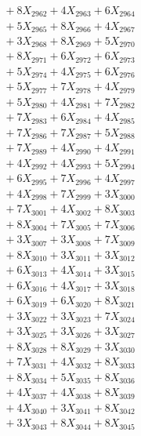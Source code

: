 \documentclass[a4paper,10pt]{article}
\begin{document}
{\begin{align}
&\;  + 8 X_{2962} + 4 X_{2963} + 6 X_{2964} \\[0.3ex]
&\;  + 5 X_{2965} + 8 X_{2966} + 4 X_{2967} \\[0.3ex]
&\;  + 3 X_{2968} + 8 X_{2969} + 5 X_{2970} \\[0.3ex]
&\;  + 8 X_{2971} + 6 X_{2972} + 6 X_{2973} \\[0.3ex]
&\;  + 5 X_{2974} + 4 X_{2975} + 6 X_{2976} \\[0.3ex]
&\;  + 5 X_{2977} + 7 X_{2978} + 4 X_{2979} \\[0.5ex]\allowbreak
&\;  + 5 X_{2980} + 4 X_{2981} + 7 X_{2982} \\[0.3ex]
&\;  + 7 X_{2983} + 6 X_{2984} + 4 X_{2985} \\[0.3ex]
&\;  + 7 X_{2986} + 7 X_{2987} + 5 X_{2988} \\[0.3ex]
&\;  + 7 X_{2989} + 4 X_{2990} + 4 X_{2991} \\[0.3ex]
&\;  + 4 X_{2992} + 4 X_{2993} + 5 X_{2994} \\[0.3ex]
&\;  + 6 X_{2995} + 7 X_{2996} + 4 X_{2997} \\[0.3ex]
&\;  + 4 X_{2998} + 7 X_{2999} + 3 X_{3000} \\[0.3ex]
&\;  + 7 X_{3001} + 4 X_{3002} + 8 X_{3003} \\[0.3ex]
&\;  + 8 X_{3004} + 7 X_{3005} + 7 X_{3006} \\[0.3ex]
&\;  + 3 X_{3007} + 3 X_{3008} + 7 X_{3009} \\[0.5ex]\allowbreak
&\;  + 8 X_{3010} + 3 X_{3011} + 3 X_{3012} \\[0.3ex]
&\;  + 6 X_{3013} + 4 X_{3014} + 3 X_{3015} \\[0.3ex]
&\;  + 6 X_{3016} + 4 X_{3017} + 3 X_{3018} \\[0.3ex]
&\;  + 6 X_{3019} + 6 X_{3020} + 8 X_{3021} \\[0.3ex]
&\;  + 3 X_{3022} + 3 X_{3023} + 7 X_{3024} \\[0.3ex]
&\;  + 3 X_{3025} + 3 X_{3026} + 3 X_{3027} \\[0.3ex]
&\;  + 8 X_{3028} + 8 X_{3029} + 3 X_{3030} \\[0.3ex]
&\;  + 7 X_{3031} + 4 X_{3032} + 8 X_{3033} \\[0.3ex]
&\;  + 8 X_{3034} + 5 X_{3035} + 8 X_{3036} \\[0.3ex]
&\;  + 4 X_{3037} + 4 X_{3038} + 8 X_{3039} \\[0.5ex]\allowbreak
&\;  + 4 X_{3040} + 3 X_{3041} + 8 X_{3042} \\[0.3ex]
&\;  + 3 X_{3043} + 8 X_{3044} + 8 X_{3045} \\[0.3ex]

\end{align}}
\end{document}
